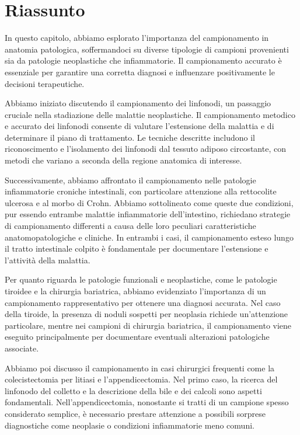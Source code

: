 \section{Riassunto}

In questo capitolo, abbiamo esplorato l'importanza del campionamento in anatomia patologica, soffermandoci su diverse tipologie di campioni provenienti sia da patologie neoplastiche che infiammatorie. Il campionamento accurato è essenziale per garantire una corretta diagnosi e influenzare positivamente le decisioni terapeutiche.

Abbiamo iniziato discutendo il campionamento dei linfonodi, un passaggio cruciale nella stadiazione delle malattie neoplastiche. Il campionamento metodico e accurato dei linfonodi consente di valutare l’estensione della malattia e di determinare il piano di trattamento. Le tecniche descritte includono il riconoscimento e l'isolamento dei linfonodi dal tessuto adiposo circostante, con metodi che variano a seconda della regione anatomica di interesse.

Successivamente, abbiamo affrontato il campionamento nelle patologie infiammatorie croniche intestinali, con particolare attenzione alla rettocolite ulcerosa e al morbo di Crohn. Abbiamo sottolineato come queste due condizioni, pur essendo entrambe malattie infiammatorie dell'intestino, richiedano strategie di campionamento differenti a causa delle loro peculiari caratteristiche anatomopatologiche e cliniche. In entrambi i casi, il campionamento esteso lungo il tratto intestinale colpito è fondamentale per documentare l'estensione e l'attività della malattia.

Per quanto riguarda le patologie funzionali e neoplastiche, come le patologie tiroidee e la chirurgia bariatrica, abbiamo evidenziato l'importanza di un campionamento rappresentativo per ottenere una diagnosi accurata. Nel caso della tiroide, la presenza di noduli sospetti per neoplasia richiede un'attenzione particolare, mentre nei campioni di chirurgia bariatrica, il campionamento viene eseguito principalmente per documentare eventuali alterazioni patologiche associate.

Abbiamo poi discusso il campionamento in casi chirurgici frequenti come la colecistectomia per litiasi e l'appendicectomia. Nel primo caso, la ricerca del linfonodo del colletto e la descrizione della bile e dei calcoli sono aspetti fondamentali. Nell'appendicectomia, nonostante si tratti di un campione spesso considerato semplice, è necessario prestare attenzione a possibili sorprese diagnostiche come neoplasie o condizioni infiammatorie meno comuni.

